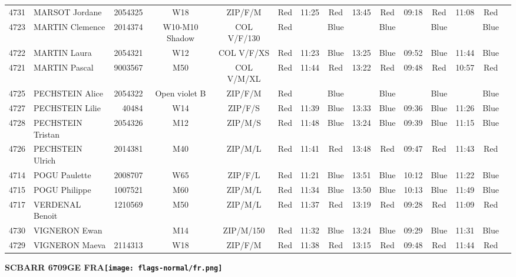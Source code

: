 \documentclass{report}
\begin{document}
\begin{longtable}{|c|l|r|c|c|*{5}{cc|}}
    4731 & MARSOT Jordane & 2054325 & W18 & ZIP/F/M & Red & 11:25 & Red & 13:45 & Red & 09:18 & Red & 11:08 & Red &  \\
    4723 & MARTIN Clemence & 2014374 & W10-M10 Shadow & COL V/F/130 & Red &   & Blue &   & Blue &   & Blue &   & Blue &  \\
    4722 & MARTIN Laura & 2054321 & W12 & COL V/F/XS & Red & 11:23 & Blue & 13:25 & Blue & 09:52 & Blue & 11:44 & Blue &  \\
    4721 & MARTIN Pascal & 9003567 & M50 & COL V/M/XL & Red & 11:44 & Red & 13:22 & Red & 09:48 & Red & 10:57 & Red &  \\
    4725 & PECHSTEIN Alice & 2054322 & Open violet B & ZIP/F/M & Red &   & Blue &   & Blue &   & Blue &   & Blue &  \\
    4727 & PECHSTEIN Lilie & 40484 & W14 & ZIP/F/S & Red & 11:39 & Blue & 13:33 & Blue & 09:36 & Blue & 11:26 & Blue &  \\
    4728 & PECHSTEIN Tristan & 2054326 & M12 & ZIP/M/S & Red & 11:48 & Blue & 13:24 & Blue & 09:39 & Blue & 11:15 & Blue &  \\
    4726 & PECHSTEIN Ulrich & 2014381 & M40 & ZIP/M/L & Red & 11:41 & Red & 13:48 & Red & 09:47 & Red & 11:43 & Red &  \\
    4714 & POGU Paulette & 2008707 & W65 & ZIP/F/L & Red & 11:21 & Blue & 13:51 & Blue & 10:12 & Blue & 11:22 & Blue &  \\
    4715 & POGU Philippe & 1007521 & M60 & ZIP/M/L & Red & 11:34 & Blue & 13:50 & Blue & 10:13 & Blue & 11:49 & Blue &  \\
    4717 & VERDENAL Benoit & 1210569 & M50 & ZIP/M/L & Red & 11:37 & Red & 13:19 & Red & 09:28 & Red & 11:09 & Red &  \\
    4730 & VIGNERON Ewan &  & M14 & ZIP/M/150 & Red & 11:32 & Blue & 13:24 & Blue & 09:29 & Blue & 11:31 & Blue &  \\
    4729 & VIGNERON Maeva & 2114313 & W18 & ZIP/F/M & Red & 11:38 & Red & 13:15 & Red & 09:48 & Red & 11:44 & Red &  \\
  \end{longtable}
\newpage
  \Huge \centering \bfseries SCBARR 6709GE FRA\normalfont \footnotesize \sffamily \hfill \texttt{[image: flags-normal/fr.png]} \newline 
\end{document}
